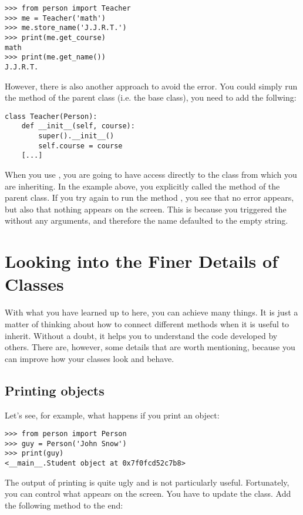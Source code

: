 \begin{verbatim}
>>> from person import Teacher
>>> me = Teacher('math')
>>> me.store_name('J.J.R.T.')
>>> print(me.get_course)
math
>>> print(me.get_name())
J.J.R.T.
\end{verbatim}

However, there is also another approach to avoid the error. You could simply run the  method of the parent class (i.e. the base class), you need to add the follwing:

\begin{verbatim}
class Teacher(Person):
    def __init__(self, course):
        super().__init__()
        self.course = course
    [...]
\end{verbatim}

When you use , you are going to have access directly to the class from which you are inheriting. In the example above, you explicitly called the  method of the parent class. If you try again to run the method , you see that no error appears, but also that nothing appears on the screen. This is because you triggered the  without any arguments, and therefore the name defaulted to the empty string.


\section{Looking into the Finer Details of Classes}\label{sec:finer-details-of-classes}
With what you have learned up to here, you can achieve many things. It is just a matter of thinking about how to connect different methods when it is useful to inherit. Without a doubt, it helps you to understand the code developed by others. There are, however, some details that are worth mentioning, because you can improve how your classes look and behave.

\subsection{Printing objects}\label{subsec:printing-objects}
Let's see, for example, what happens if you print an object:
\begin{verbatim}
>>> from person import Person
>>> guy = Person('John Snow')
>>> print(guy)
<__main__.Student object at 0x7f0fcd52c7b8>
\end{verbatim}
The output of printing  is quite ugly and is not particularly useful. Fortunately, you can control what appears on the screen. You have to update the  class. Add the following method to the end:

